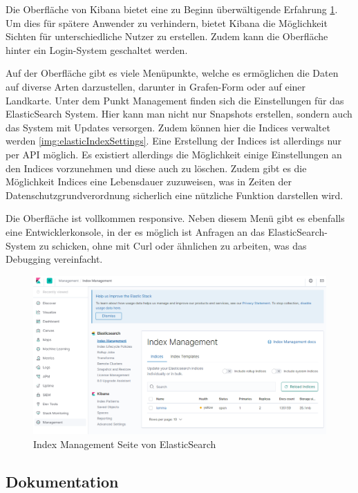 Die Oberfläche von Kibana bietet eine zu Beginn überwältigende Erfahrung \ref{img:elasticInterface}. Um dies für spätere Anwender zu verhindern, bietet Kibana die Möglichkeit Sichten für unterschiedliche Nutzer zu erstellen. Zudem kann die Oberfläche hinter ein Login-System geschaltet werden.

Auf der Oberfläche gibt es viele Menüpunkte, welche es ermöglichen die Daten auf diverse Arten darzustellen, darunter in Grafen-Form oder auf einer Landkarte. Unter dem Punkt Management finden sich die Einstellungen für das ElasticSearch System. Hier kann man nicht nur Snapshots erstellen, sondern auch das System mit Updates versorgen. Zudem können hier die Indices verwaltet werden \ref{img:elasticIndexSettings}. Eine Erstellung der Indices ist allerdings nur per API möglich. Es existiert allerdings die Möglichkeit einige Einstellungen an den Indices vorzunehmen und diese auch zu löschen. Zudem gibt es die Möglichkeit Indices eine Lebensdauer zuzuweisen, was in Zeiten der Datenschutzgrundverordnung sicherlich eine nützliche Funktion darstellen wird. 

Die Oberfläche ist vollkommen responsive. Neben diesem Menü gibt es ebenfalls eine Entwicklerkonsole, in der es möglich ist Anfragen an das ElasticSearch-System zu schicken, ohne mit Curl oder ähnlichen zu arbeiten, was das Debugging vereinfacht.

\begin{figure}
	\centering
	\includegraphics[width=1\linewidth]{images/elastic_ui.png}
	\caption{Index Management Seite von ElasticSearch}
	\label{img:elasticInterface}
\end{figure}


\subsection{Dokumentation}


